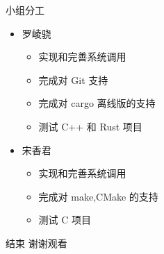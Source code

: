 \documentclass{beamer}
\begin{document}
\begin{frame}{小组分工}
    \begin{itemize}
        \item 罗崚骁
        \begin{itemize}
            \setlength{\itemsep}{8pt}
            \item 实现和完善系统调用
            \item 完成对 Git 支持
            \item 完成对 cargo 离线版的支持
            \item 测试 C++ 和 Rust 项目
        \end{itemize}
        \item 宋香君
        \begin{itemize}
            \setlength{\itemsep}{8pt}
            \item 实现和完善系统调用
            \item 完成对 make,CMake 的支持
            \item 测试 C 项目
        \end{itemize}
    \end{itemize}
\end{frame}

\begin{frame}{结束}
    谢谢观看
\end{frame}
\end{document}
